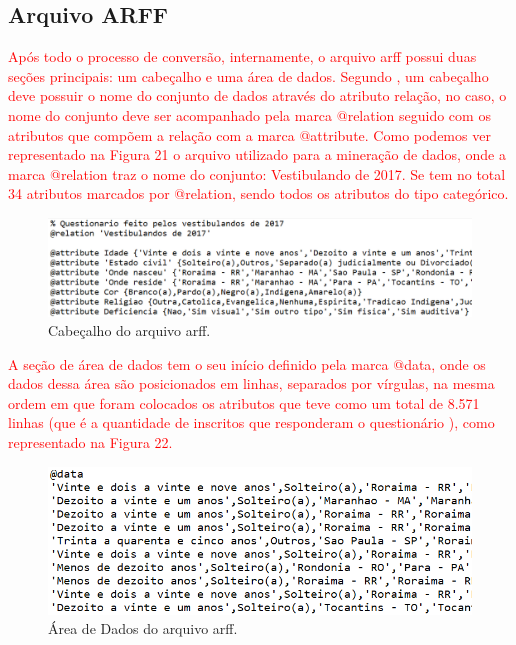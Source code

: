 \subsection{Arquivo ARFF}

\par
\textcolor{red}{Após todo o processo de conversão, internamente, o arquivo arff possui duas seções principais: um cabeçalho e uma área de dados. Segundo , um cabeçalho deve possuir o nome do conjunto de dados através do atributo relação, no caso, o nome do conjunto deve ser acompanhado pela marca @relation seguido com os atributos que compõem a relação com a marca @attribute. Como podemos ver representado na Figura 21 o arquivo utilizado para a mineração de dados, onde a marca @relation traz o nome do conjunto: Vestibulando de 2017. Se tem no total 34 atributos marcados por @relation, sendo todos os atributos do tipo categórico.} 

\par
\begin{figure}[!htp]
	\begin{center}
    \caption{\label{fig:waveform_fig} Cabeçalho do arquivo arff.}
	\includegraphics[scale=0.57]{Figuras/arquivo_arff.png}
	\end{center}
\end{figure}

\par
\textcolor{red}{A seção de área de dados tem o seu início definido pela marca @data, onde os dados dessa área são posicionados em linhas, separados por vírgulas, na mesma ordem em que foram colocados os atributos que teve como um total de 8.571 linhas (que é a quantidade de inscritos que responderam o questionário ), como representado na Figura 22.}

\par
\begin{figure}[!htp]
	\begin{center}
    \caption{\label{fig:waveform_fig} Área de Dados do arquivo arff.}
	\includegraphics[scale=0.60]{Figuras/arquivo_arff_2.png}
	\end{center}
\end{figure}


